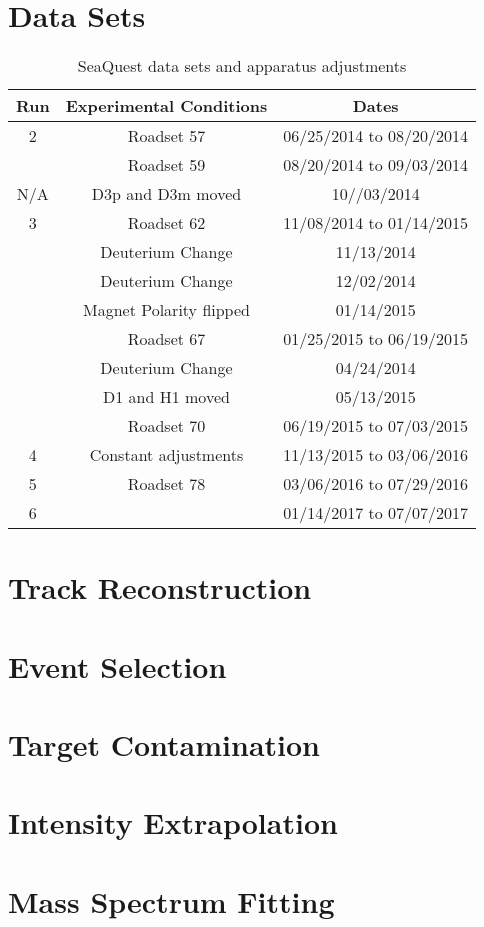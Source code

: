 \section{Data Sets}

\begin{table}[h!]
	\centering
	\begin{tabular}{ c c c }
		\hline
		Run & Experimental Conditions & Dates\\
		\hline
		2   & Roadset 57 & 06/25/2014 to 08/20/2014\\
		    & Roadset 59 & 08/20/2014 to 09/03/2014\\
		\hline
		N/A & D3p and D3m moved & 10//03/2014\\
		\hline
		3   & Roadset 62 & 11/08/2014 to 01/14/2015\\
		    & Deuterium Change & 11/13/2014\\
		    & Deuterium Change & 12/02/2014\\
		    & Magnet Polarity flipped & 01/14/2015\\
		    & Roadset 67 & 01/25/2015 to 06/19/2015\\
		    & Deuterium Change & 04/24/2014\\
		    & D1 and H1 moved & 05/13/2015\\
		    & Roadset 70 & 06/19/2015 to 07/03/2015\\
		\hline
		4   & Constant adjustments & 11/13/2015 to 03/06/2016\\
		5   & Roadset 78 & 03/06/2016 to 07/29/2016\\
		6   &   & 01/14/2017 to 07/07/2017\\
	\end{tabular}
	\caption{SeaQuest data sets and apparatus adjustments}
	\label{tab:dataset}
\end{table}


\section{Track Reconstruction}

\section{Event Selection}

\section{Target Contamination}

\section{Intensity Extrapolation}

\section{Mass Spectrum Fitting}
